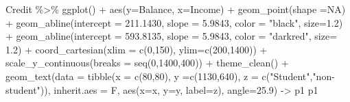 \documentclass[
  letterpaper,
  DIV=11,
  numbers=noendperiod]{scrreprt}
\newenvironment{Shaded}{\begin{snugshade}}{\end{snugshade}}
\newcommand{\AttributeTok}[1]{\textcolor[rgb]{0.65,0.35,0.00}{#1}}
\newcommand{\ConstantTok}[1]{\textcolor[rgb]{0.85,0.12,0.09}{#1}}
\newcommand{\DecValTok}[1]{\textcolor[rgb]{0.47,0.16,0.63}{#1}}
\newcommand{\FloatTok}[1]{\textcolor[rgb]{0.65,0.35,0.00}{#1}}
\newcommand{\FunctionTok}[1]{\textcolor[rgb]{0.02,0.16,0.49}{#1}}
\newcommand{\NormalTok}[1]{\textcolor[rgb]{0.33,0.33,0.33}{#1}}
\newcommand{\OtherTok}[1]{\textcolor[rgb]{0.85,0.12,0.09}{#1}}
\newcommand{\SpecialCharTok}[1]{\textcolor[rgb]{0.00,0.46,0.62}{#1}}
\newcommand{\StringTok}[1]{\textcolor[rgb]{0.00,0.50,0.00}{#1}}
\begin{document}
\begin{Shaded}
\begin{Highlighting}[]
\NormalTok{Credit }\SpecialCharTok{\%\textgreater{}\%} 
  \FunctionTok{ggplot}\NormalTok{() }\SpecialCharTok{+} \FunctionTok{aes}\NormalTok{(}\AttributeTok{y=}\NormalTok{Balance, }\AttributeTok{x=}\NormalTok{Income) }\SpecialCharTok{+} \FunctionTok{geom\_point}\NormalTok{(}\AttributeTok{shape =}\ConstantTok{NA}\NormalTok{) }\SpecialCharTok{+} \FunctionTok{geom\_abline}\NormalTok{(}\AttributeTok{intercept =} \FloatTok{211.1430}\NormalTok{, }\AttributeTok{slope =} \FloatTok{5.9843}\NormalTok{, }\AttributeTok{color =} \StringTok{"black"}\NormalTok{, }\AttributeTok{size=}\FloatTok{1.2}\NormalTok{) }\SpecialCharTok{+} \FunctionTok{geom\_abline}\NormalTok{(}\AttributeTok{intercept =} \FloatTok{593.8135}\NormalTok{, }\AttributeTok{slope =} \FloatTok{5.9843}\NormalTok{, }\AttributeTok{color =} \StringTok{"darkred"}\NormalTok{, }\AttributeTok{size=} \FloatTok{1.2}\NormalTok{) }\SpecialCharTok{+} \FunctionTok{coord\_cartesian}\NormalTok{(}\AttributeTok{xlim =} \FunctionTok{c}\NormalTok{(}\DecValTok{0}\NormalTok{,}\DecValTok{150}\NormalTok{), }\AttributeTok{ylim=}\FunctionTok{c}\NormalTok{(}\DecValTok{200}\NormalTok{,}\DecValTok{1400}\NormalTok{)) }\SpecialCharTok{+} \FunctionTok{scale\_y\_continuous}\NormalTok{(}\AttributeTok{breaks =} \FunctionTok{seq}\NormalTok{(}\DecValTok{0}\NormalTok{,}\DecValTok{1400}\NormalTok{,}\DecValTok{400}\NormalTok{)) }\SpecialCharTok{+} \FunctionTok{theme\_clean}\NormalTok{() }\SpecialCharTok{+} \FunctionTok{geom\_text}\NormalTok{(}\AttributeTok{data =} \FunctionTok{tibble}\NormalTok{(}\AttributeTok{x =} \FunctionTok{c}\NormalTok{(}\DecValTok{80}\NormalTok{,}\DecValTok{80}\NormalTok{), }\AttributeTok{y =}\FunctionTok{c}\NormalTok{(}\DecValTok{1130}\NormalTok{,}\DecValTok{640}\NormalTok{), }\AttributeTok{z =} \FunctionTok{c}\NormalTok{(}\StringTok{"Student"}\NormalTok{,}\StringTok{"non{-}student"}\NormalTok{)), }\AttributeTok{inherit.aes =}\NormalTok{ F, }\FunctionTok{aes}\NormalTok{(}\AttributeTok{x=}\NormalTok{x, }\AttributeTok{y=}\NormalTok{y, }\AttributeTok{label=}\NormalTok{z), }\AttributeTok{angle=}\FloatTok{25.9}\NormalTok{) }\OtherTok{{-}\textgreater{}}\NormalTok{ p1}
\NormalTok{p1}
\end{Highlighting}
\end{Shaded}
\end{document}

